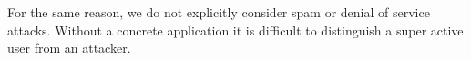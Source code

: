 For the same reason, we do not explicitly consider spam or denial of service attacks.
Without a concrete application it is difficult to distinguish a super active user from an attacker.




